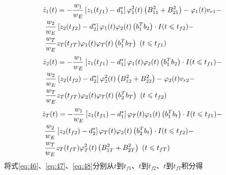 \begin{equation}
\label{eq:46}
\begin{gathered}
  {{\dot z}_1}(t) =  - \frac{{{w_1}}}{{{w_E}}}\left[ {{z_1}({t_{f1}}) - d_1^*} \right]\varphi _1^2(t)\left( {B_{11}^2 + B_{21}^2} \right) - {\varphi _1}(t){v_{r1}} -  \hfill \\
  {\text{          }}\frac{{{w_2}}}{{{w_E}}}\left[ {{z_2}({t_{f2}}) - d_2^*} \right]{\varphi _1}(t){\varphi _2}(t)\left( {b_1^T{b_2}} \right) \cdot I(t \leqslant {t_{f2}}) - \quad  \hfill \\
  {\text{          }}\frac{{{w_T}}}{{{w_E}}}{z_T}({t_{fT}}){\varphi _1}(t){\varphi _T}(t)\left( {b_1^T{b_T}} \right){\text{   }}(t \leqslant {t_{f1}}) \hfill \\ 
\end{gathered}
\end{equation}
\begin{equation}
\label{eq:47}
\begin{gathered}
  {{\dot z}_2}(t) =  - \frac{{{w_1}}}{{{w_E}}}\left[ {{z_1}({t_{f1}}) - d_1^*} \right]{\varphi _1}(t){\varphi _2}(t)\left( {b_1^T{b_2}} \right) \cdot I(t \leqslant {t_{f1}}) -  \hfill \\
  {\text{          }}\frac{{{w_2}}}{{{w_E}}}\left[ {{z_2}({t_{f2}}) - d_2^*} \right]\varphi _2^2(t)\left( {B_{12}^2 + B_{22}^2} \right) - {\varphi _2}(t){v_{r2}} -  \hfill \\
  {\text{          }}\frac{{{w_T}}}{{{w_E}}}{z_T}({t_{fT}}){\varphi _2}(t){\varphi _T}(t)\left( {b_2^T{b_T}} \right){\text{   }}(t \leqslant {t_{f2}}) \hfill \\ 
\end{gathered}
\end{equation}
\begin{equation}
\label{eq:48}
\begin{gathered}
  {{\dot z}_T}(t) =  - \frac{{{w_1}}}{{{w_E}}}\left[ {{z_1}({t_{f1}}) - d_1^*} \right]{\varphi _T}(t){\varphi _1}(t)\left( {b_1^T{b_t}} \right) \cdot I(t \leqslant {t_{f1}}) -  \hfill \\
  {\text{          }}\frac{{{w_2}}}{{{w_E}}}\left[ {{z_2}({t_{f2}}) - d_2^*} \right]{\varphi _T}(t){\varphi _2}(t)\left( {b_2^T{b_t}} \right) \cdot I(t \leqslant {t_{f2}}) - \quad  \hfill \\
  {\text{          }}\frac{{{w_T}}}{{{w_E}}}{z_T}({t_{fT}})\varphi _T^2(t)\left( {B_{1T}^2 + B_{2T}^2} \right){\text{   }}(t \leqslant {t_{fT}}) \hfill \\ 
\end{gathered}
\end{equation}
将式\eqref{eq:46}、\eqref{eq:47}、\eqref{eq:48}分别从$t$到${t_{f1}}$、$t$到${t_{f2}}$、$t$到${t_{fT}}$积分得

